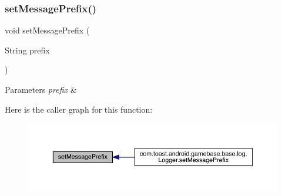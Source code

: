 \mbox{\label{interfacecom_1_1toast_1_1android_1_1gamebase_1_1base_1_1log_1_1_loggable_a16862458952f90c6a6b0a43119aeeafc}} 
\subsubsection{\texorpdfstring{set\+Message\+Prefix()}{setMessagePrefix()}}
{\footnotesize\ttfamily void set\+Message\+Prefix (\begin{DoxyParamCaption}\item[{String}]{prefix }\end{DoxyParamCaption})}


\begin{DoxyParams}{Parameters}
{\em prefix} & \\
\hline
\end{DoxyParams}
Here is the caller graph for this function\+:
\nopagebreak
\begin{figure}[H]
\begin{center}
\leavevmode
\includegraphics[width=350pt]{interfacecom_1_1toast_1_1android_1_1gamebase_1_1base_1_1log_1_1_loggable_a16862458952f90c6a6b0a43119aeeafc_icgraph}
\end{center}
\end{figure}
